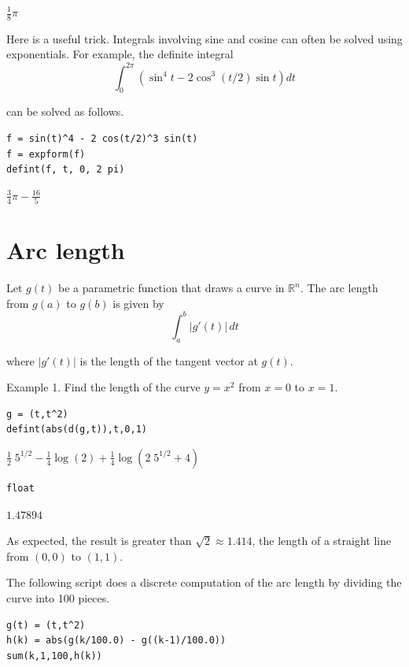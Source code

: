 \documentclass[12pt]{article}
\begin{document}
$\displaystyle \tfrac{1}{8}\pi$

\bigskip
Here is a useful trick.
Integrals involving sine and cosine
can often be solved using exponentials.
For example, the definite integral
\begin{equation*}
\int_0^{2\pi}\left(\sin^4t-2\cos^3(t/2)\sin t\right)dt
\end{equation*}

can be solved as follows.

{\color{blue}
\begin{verbatim}
f = sin(t)^4 - 2 cos(t/2)^3 sin(t)
f = expform(f)
defint(f, t, 0, 2 pi)
\end{verbatim}
}

$\displaystyle \tfrac{3}{4}\pi-\tfrac{16}{5}$

\newpage

\section{Arc length}

Let $g(t)$ be a parametric function that draws a curve in $\mathbb R^n$.
The arc length from $g(a)$ to $g(b)$ is given by
\begin{equation*}
\int_a^b|g'(t)|\,dt
\end{equation*}

where $|g'(t)|$ is the length of the tangent vector at $g(t)$.

\bigskip
Example 1.
Find the length of the curve $y=x^2$ from $x=0$ to $x=1$.

{\color{blue}
\begin{verbatim}
g = (t,t^2)
defint(abs(d(g,t)),t,0,1)
\end{verbatim}}

$
\tfrac{1}{2}\;5^{1/2}
-\tfrac{1}{4}\log(2)
+\tfrac{1}{4}\log(2\;5^{1/2}+4)
$

{\color{blue}
\begin{verbatim}
float
\end{verbatim}}

$1.47894$

\bigskip
As expected, the result is greater than $\sqrt2\approx1.414$,
the length of a straight line from $(0,0)$ to $(1,1)$.

\bigskip
The following script does a discrete computation of the arc length
by dividing the curve into 100 pieces.

{\color{blue}
\begin{verbatim}
g(t) = (t,t^2)
h(k) = abs(g(k/100.0) - g((k-1)/100.0))
sum(k,1,100,h(k))
\end{verbatim}}
\end{document}
